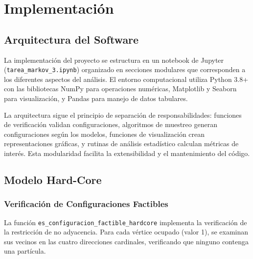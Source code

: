 \section{Implementación}

\subsection{Arquitectura del Software}

La implementación del proyecto se estructura en un notebook de Jupyter (\texttt{tarea\_markov\_3.ipynb}) organizado en secciones modulares que corresponden a los diferentes aspectos del análisis. El entorno computacional utiliza Python 3.8+ con las bibliotecas NumPy para operaciones numéricas, Matplotlib y Seaborn para visualización, y Pandas para manejo de datos tabulares.

La arquitectura sigue el principio de separación de responsabilidades: funciones de verificación validan configuraciones, algoritmos de muestreo generan configuraciones según los modelos, funciones de visualización crean representaciones gráficas, y rutinas de análisis estadístico calculan métricas de interés. Esta modularidad facilita la extensibilidad y el mantenimiento del código.

\subsection{Modelo Hard-Core}

\subsubsection{Verificación de Configuraciones Factibles}

La función \texttt{es\_configuracion\_factible\_hardcore} implementa la verificación de la restricción de no adyacencia. Para cada vértice ocupado (valor 1), se examinan sus vecinos en las cuatro direcciones cardinales, verificando que ninguno contenga una partícula.


